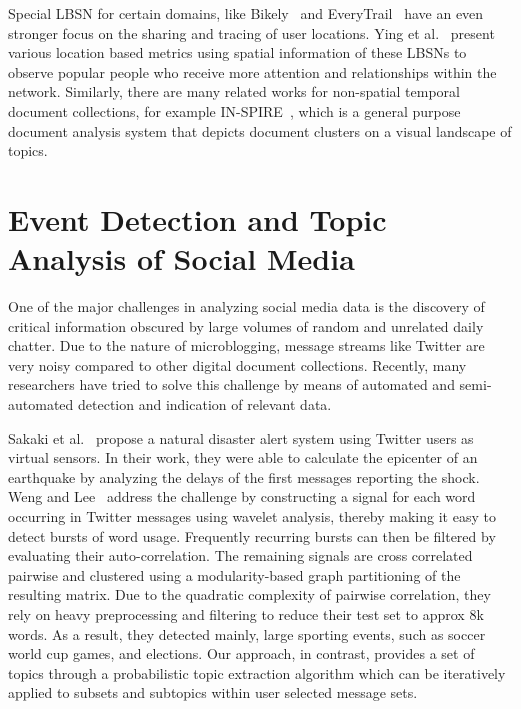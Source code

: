 Special LBSN for certain domains, like Bikely~\cite{Bikely:2012:Web} and EveryTrail~\cite{EveryTrail:2012:Web} have an even stronger focus on the sharing and tracing of user locations.
Ying et al.~\cite{Ying:2011:UAA} present various location based metrics using spatial information of these LBSNs to observe popular people who receive more attention and relationships within the network.
Similarly, there are many related works for non-spatial temporal document collections, for example IN-SPIRE~\cite{inspire}, which is a general purpose document analysis system that depicts document clusters on a visual landscape of topics.

\section{Event Detection and Topic Analysis of Social Media}
One of the major challenges in analyzing social media data is the discovery of critical information obscured by large volumes of random and unrelated daily chatter.
Due to the nature of microblogging, message streams like Twitter are very noisy compared to other digital document collections.
Recently, many researchers have tried to solve this challenge by means of automated and semi-automated detection and indication of relevant data.

Sakaki et al.~\cite{Sakaki:2010:EST} propose a natural disaster alert system using Twitter users as virtual sensors.
In their work, they were able to calculate the epicenter of an earthquake by analyzing the delays of the first messages reporting the shock.
Weng and Lee~\cite{Weng:2011:EDI} address the challenge by constructing a signal for each word occurring in Twitter messages using wavelet analysis, thereby making it easy to detect bursts of word usage.
Frequently recurring bursts can then be filtered by evaluating their auto-correlation.
The remaining signals are cross correlated pairwise and clustered using a modularity-based graph partitioning of the resulting matrix.
Due to the quadratic complexity of pairwise correlation, they rely on heavy preprocessing and filtering to reduce their test set to approx 8k words.
As a result, they detected mainly, large sporting events, such as soccer world cup games, and elections.
Our approach, in contrast, provides a set of topics through a probabilistic topic extraction algorithm which can be iteratively applied to subsets and subtopics within user selected message sets.

